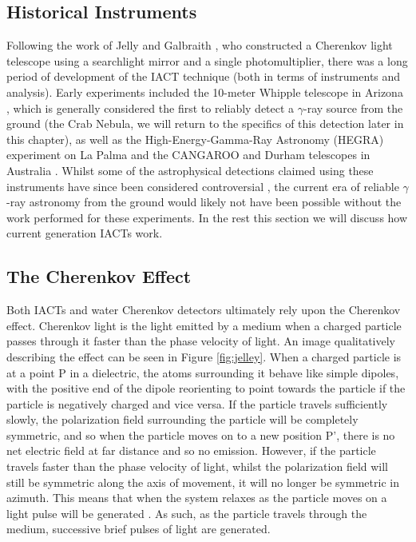 \subsection{Historical Instruments}
Following the work of Jelly and Galbraith \cite{G+J}, who constructed a Cherenkov light telescope using a searchlight mirror and a single photomultiplier, there was a long period of development of the IACT technique (both in terms of instruments and analysis). Early experiments included the 10-meter Whipple telescope in Arizona \cite{whipple}, which is generally considered the first to reliably detect a $\gamma$-ray source from the ground (the Crab Nebula, we will return to the specifics of this detection later in this chapter), as well as the High-Energy-Gamma-Ray Astronomy (HEGRA) experiment on La Palma \cite{HEGRA} and the CANGAROO and Durham telescopes in Australia \cite{CANGAROO} \cite{DURHAM}. Whilst some of the astrophysical detections claimed using these instruments have since been considered controversial \cite{hintonicrc30}, the current era of reliable $\gamma$-ray astronomy from the ground would likely not have been possible without the work performed for these experiments. In the rest this section we will discuss how current generation IACTs work. 

\subsection{The Cherenkov Effect}
Both IACTs and water Cherenkov detectors ultimately rely upon the Cherenkov effect. Cherenkov light is the light emitted by a medium when a charged particle passes through it faster than the phase velocity of light. An image qualitatively describing the effect can be seen in Figure \ref{fig:jelley}. When a charged particle is at a point P in a dielectric, the atoms surrounding it behave like simple dipoles, with the positive end of the dipole reorienting to point towards the particle if the particle is negatively charged and vice versa. If the particle travels sufficiently slowly, the polarization field surrounding the particle will be completely symmetric, and so when the particle moves on to a new position P', there is no net electric field at far distance and so no emission. However, if the particle travels faster than the phase velocity of light, whilst the polarization field will still be symmetric along the axis of movement, it will no longer be symmetric in azimuth. This means that when the system relaxes as the particle moves on a light pulse will be generated \cite{jelley}. As such, as the particle travels through the medium, successive brief pulses of light are generated. 

